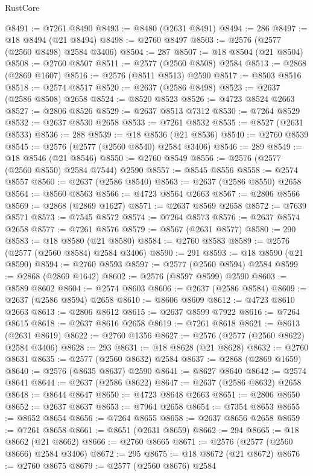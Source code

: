\begin{lexlean}{RustCore}
\begin{coremodule}
@8491 := @7261 @8490
@8493 := @8480 (@2631 @8491)
@8494 := 286
@8497 := @18 @8494 (@21 @8494)
@8498 := @2760 @8497
@8503 := @2576 (@2577 (@2560 @8498) @2584 @3406)
@8504 := 287
@8507 := @18 @8504 (@21 @8504)
@8508 := @2760 @8507
@8511 := @2577 (@2560 @8508) @2584
@8513 := @2868 (@2869 @1607)
@8516 := @2576 (@8511 @8513) @2590
@8517 := @8503 @8516
@8518 := @2574 @8517
@8520 := @2637 (@2586 @8498)
@8523 := @2637 (@2586 @8508) @2658
@8524 := @8520 @8523
@8526 := @4723 @8524 @2663
@8527 := @2806 @8526
@8529 := @2637 @8513 @7312
@8530 := @7264 @8529
@8532 := @2637 @8530 @2658
@8533 := @7261 @8532
@8535 := @8527 (@2631 @8533)
@8536 := 288
@8539 := @18 @8536 (@21 @8536)
@8540 := @2760 @8539
@8545 := @2576 (@2577 (@2560 @8540) @2584 @3406)
@8546 := 289
@8549 := @18 @8546 (@21 @8546)
@8550 := @2760 @8549
@8556 := @2576 (@2577 (@2560 @8550) @2584 @7544) @2590
@8557 := @8545 @8556
@8558 := @2574 @8557
@8560 := @2637 (@2586 @8540)
@8563 := @2637 (@2586 @8550) @2658
@8564 := @8560 @8563
@8566 := @4723 @8564 @2663
@8567 := @2806 @8566
@8569 := @2868 (@2869 @1627)
@8571 := @2637 @8569 @2658
@8572 := @7639 @8571
@8573 := @7545 @8572
@8574 := @7264 @8573
@8576 := @2637 @8574 @2658
@8577 := @7261 @8576
@8579 := @8567 (@2631 @8577)
@8580 := 290
@8583 := @18 @8580 (@21 @8580)
@8584 := @2760 @8583
@8589 := @2576 (@2577 (@2560 @8584) @2584 @3406)
@8590 := 291
@8593 := @18 @8590 (@21 @8590)
@8594 := @2760 @8593
@8597 := @2577 (@2560 @8594) @2584
@8599 := @2868 (@2869 @1642)
@8602 := @2576 (@8597 @8599) @2590
@8603 := @8589 @8602
@8604 := @2574 @8603
@8606 := @2637 (@2586 @8584)
@8609 := @2637 (@2586 @8594) @2658
@8610 := @8606 @8609
@8612 := @4723 @8610 @2663
@8613 := @2806 @8612
@8615 := @2637 @8599 @7922
@8616 := @7264 @8615
@8618 := @2637 @8616 @2658
@8619 := @7261 @8618
@8621 := @8613 (@2631 @8619)
@8622 := @2760 @1356
@8627 := @2576 (@2577 (@2560 @8622) @2584 @3406)
@8628 := 293
@8631 := @18 @8628 (@21 @8628)
@8632 := @2760 @8631
@8635 := @2577 (@2560 @8632) @2584
@8637 := @2868 (@2869 @1659)
@8640 := @2576 (@8635 @8637) @2590
@8641 := @8627 @8640
@8642 := @2574 @8641
@8644 := @2637 (@2586 @8622)
@8647 := @2637 (@2586 @8632) @2658
@8648 := @8644 @8647
@8650 := @4723 @8648 @2663
@8651 := @2806 @8650
@8652 := @2637 @8637
@8653 := @7964 @2658
@8654 := @7354 @8653
@8655 := @8652 @8654
@8656 := @7264 @8655
@8658 := @2637 @8656 @2658
@8659 := @7261 @8658
@8661 := @8651 (@2631 @8659)
@8662 := 294
@8665 := @18 @8662 (@21 @8662)
@8666 := @2760 @8665
@8671 := @2576 (@2577 (@2560 @8666) @2584 @3406)
@8672 := 295
@8675 := @18 @8672 (@21 @8672)
@8676 := @2760 @8675
@8679 := @2577 (@2560 @8676) @2584

\end{coremodule}
\end{lexlean}
